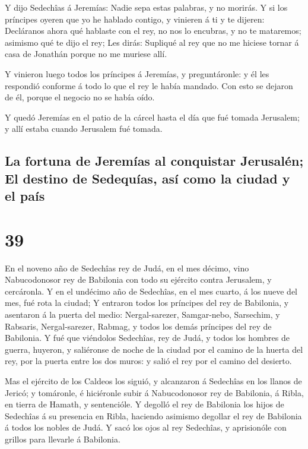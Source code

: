  Y dijo Sedechîas á Jeremías: Nadie sepa estas palabras,
y no morirás.  Y si los príncipes oyeren que yo he
hablado contigo, y vinieren á ti y te dijeren: Decláranos ahora qué
hablaste con el rey, no nos lo encubras, y no te mataremos; asimismo qué
te dijo el rey;  Les dirás: Supliqué al rey que no me
hiciese tornar á casa de Jonathán porque no me muriese allí.

 Y vinieron luego todos los príncipes á Jeremías, y
preguntáronle: y él les respondió conforme á todo lo que el rey le había
mandado. Con esto se dejaron de él, porque el negocio no se había oído.

 Y quedó Jeremías en el patio de la cárcel hasta el día
que fué tomada Jerusalem; y allí estaba cuando Jerusalem fué tomada.

\hypertarget{la-fortuna-de-jeremuxedas-al-conquistar-jerusaluxe9n-el-destino-de-sedequuxedas-asuxed-como-la-ciudad-y-el-pauxeds}{%
\subsection{La fortuna de Jeremías al conquistar Jerusalén; El destino
de Sedequías, así como la ciudad y el
país}\label{la-fortuna-de-jeremuxedas-al-conquistar-jerusaluxe9n-el-destino-de-sedequuxedas-asuxed-como-la-ciudad-y-el-pauxeds}}

\hypertarget{section-24-39}{%
\section{39}\label{section-24-39}}

 En el noveno año de Sedechîas rey de Judá, en el mes
décimo, vino Nabucodonosor rey de Babilonia con todo su ejército contra
Jerusalem, y cercáronla.  Y en el undécimo año de
Sedechîas, en el mes cuarto, á los nueve del mes, fué rota la ciudad;
 Y entraron todos los príncipes del rey de Babilonia, y
asentaron á la puerta del medio: Nergal-sarezer, Samgar-nebo, Sarsechim,
y Rabsaris, Nergal-sarezer, Rabmag, y todos los demás príncipes del rey
de Babilonia.  Y fué que viéndolos Sedechîas, rey de Judá,
y todos los hombres de guerra, huyeron, y saliéronse de noche de la
ciudad por el camino de la huerta del rey, por la puerta entre los dos
muros: y salió el rey por el camino del desierto.

 Mas el ejército de los Caldeos los siguió, y alcanzaron á
Sedechîas en los llanos de Jericó; y tomáronle, é hiciéronle subir á
Nabucodonosor rey de Babilonia, á Ribla, en tierra de Hamath, y
sentencióle.  Y degolló el rey de Babilonia los hijos de
Sedechîas á su presencia en Ribla, haciendo asimismo degollar el rey de
Babilonia á todos los nobles de Judá.  Y sacó los ojos al
rey Sedechîas, y aprisionóle con grillos para llevarle á Babilonia.

